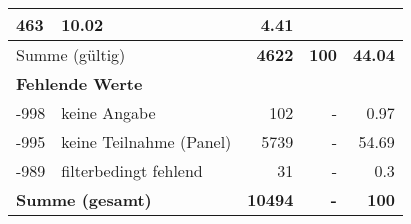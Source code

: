 \begin{longtable}{lXrrr}
       \num{463} &
       \num[round-mode=places,round-precision=2]{10,02} &
         \num[round-mode=places,round-precision=2]{4,41} \\
     \midrule
     \multicolumn{2}{l}{Summe (gültig)} &
       \textbf{\num{4622}} &
     \textbf{100} &
       \textbf{\num[round-mode=places,round-precision=2]{44,04}} \\
     \multicolumn{5}{l}{\textbf{Fehlende Werte}}\\
       -998 &
       keine Angabe &
         \num{102} &
        - &
         \num[round-mode=places,round-precision=2]{0,97} \\
       -995 &
       keine Teilnahme (Panel) &
         \num{5739} &
        - &
         \num[round-mode=places,round-precision=2]{54,69} \\
       -989 &
       filterbedingt fehlend &
         \num{31} &
        - &
         \num[round-mode=places,round-precision=2]{0,3} \\
     \midrule
     \multicolumn{2}{l}{\textbf{Summe (gesamt)}} &
          \textbf{\num{10494}} &
        \textbf{-} &
        \textbf{100} \\
     \bottomrule
     \end{longtable}
     
